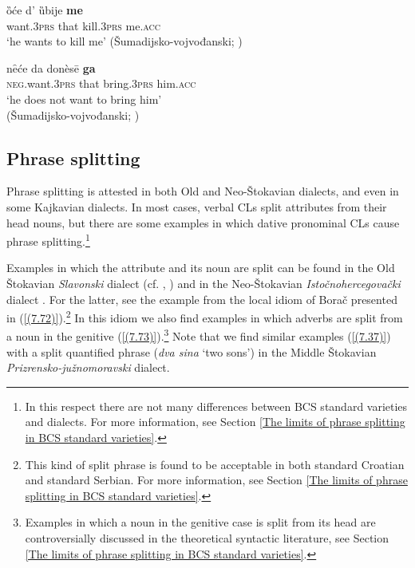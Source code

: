 \begin{exe}\ex\label{(7.57)}
\gll ȍće  d’ ȕbije  \textbf{me}  \\
want.3\textsc{prs}  that  kill.3\textsc{prs} me.\textsc{acc} \\
\glt ‘he wants to kill me’
\hfill  (Šumadijsko-vojvođanski; \citealt[280]{Nikolic66})

\ex\label{(7.58)}
\gll nȇće  da  donèsē  \textbf{ga}  \\
\textsc{neg}.want.3\textsc{prs} that  bring.3\textsc{prs} him.\textsc{acc} \\
\glt ‘he does not want to bring him’ \\
\hfill  (Šumadijsko-vojvođanski; \citealt[280]{Nikolic66})
\end{exe}

\subsection{Phrase splitting}
\label{Phrase splitting}
Phrase splitting is attested in both Old and Neo-Štokavian dialects, and even in some Kajkavian dialects. In most cases, verbal CLs split attributes from their head nouns, but there are some examples in which dative pronominal CLs cause phrase splitting.\footnote{In this respect there are not many differences between BCS standard varieties and dialects. For more information, see Section \ref{The limits of phrase splitting in BCS standard varieties}.}

Examples in which the attribute and its noun are split can be found in the Old Štokavian \textit{Slavonski} dialect (cf. \citealt[412f]{Sekeres77}, \citealt[103]{Golic93}) and in the Neo-Štokavian \textit{Istočnohercegovački} dialect \citep[cf.][283]{Peco07a}. For the latter, see the example from the local idiom of Borač presented in (\ref{(7.72)}).\footnote{This kind of split phrase is found to be acceptable in both standard Croatian and standard Serbian. For more information, see Section \ref{The limits of phrase splitting in BCS standard varieties}.} In this idiom we also find examples in which adverbs are split from a noun in the genitive (\ref{(7.73)}).\footnote{Examples in which a noun in the genitive case is split from its head are controversially discussed in the theoretical syntactic literature, see Section \ref{The limits of phrase splitting in BCS standard varieties}.} Note that we find similar examples (\ref{(7.37)}) with a split quantified phrase (\textit{dva sina} ‘two sons’) in the Middle Štokavian \textit{Prizrensko-južnomoravski} dialect.

